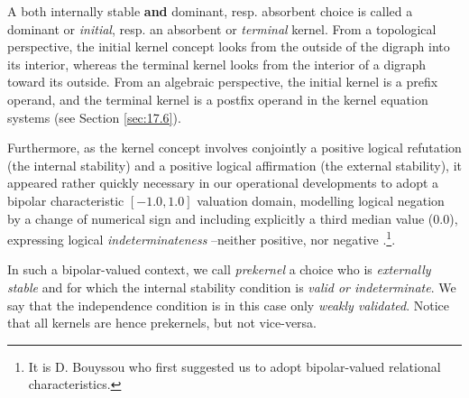 A both internally stable \textbf{and} dominant, resp. absorbent choice is called a dominant or \emph{initial}, resp. an absorbent or \emph{terminal} kernel. From a topological perspective, the initial kernel concept looks from the outside of the digraph into its interior, whereas the terminal kernel looks from the interior of a digraph toward its outside. From an algebraic perspective, the initial kernel is a prefix operand, and the terminal kernel is a postfix operand in the \Berge kernel equation systems (see Section \ref{sec:17.6}).

Furthermore, as the kernel concept involves conjointly a positive logical refutation (the internal stability) and a positive logical affirmation (the external stability), it appeared rather quickly necessary in our operational developments to adopt a bipolar characteristic $[-1.0,1.0]$ valuation domain, modelling logical negation by a change of numerical sign and including explicitly a third median value ($0.0$), expressing logical \emph{indeterminateness} --neither positive, nor negative \citep{BIS-2000,BIS-2002,BIS-2004a}.\footnote{It is D. Bouyssou  who first suggested us to adopt bipolar-valued relational characteristics.}.

In such a  bipolar-valued context, we call \emph{prekernel} a choice who is \emph{externally stable} and for which the internal stability condition is \emph{valid or indeterminate}. We say that the independence condition is in this case only \emph{weakly validated}. Notice that all kernels are hence prekernels, but not vice-versa.

